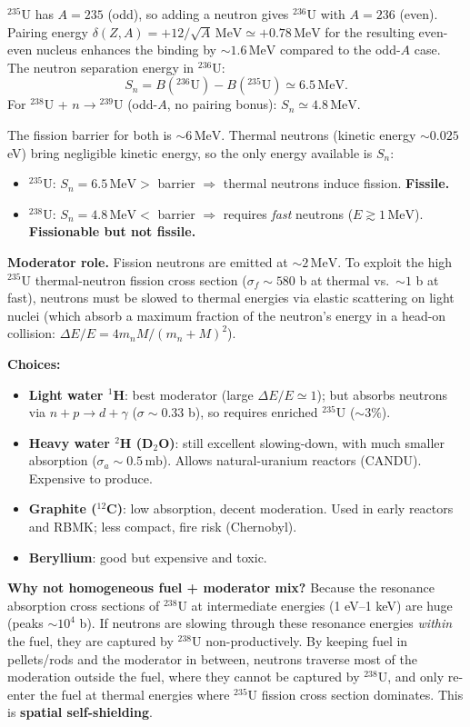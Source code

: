 \documentclass[11pt]{article}
\newcommand{\MeV}{\,\mathrm{MeV}}
\begin{document}
$^{235}$U has $A=235$ (odd), so adding a neutron gives $^{236}$U with $A=236$ (even). Pairing energy $\delta(Z,A)=+12/\sqrt{A}\MeV\simeq +0.78\MeV$ for the resulting even-even nucleus enhances the binding by $\sim 1.6\MeV$ compared to the odd-$A$ case. The neutron separation energy in $^{236}$U:
\[
S_n=B(^{236}\text{U})-B(^{235}\text{U})\simeq 6.5\MeV.
\]
For $^{238}$U + $n\to{}^{239}$U (odd-$A$, no pairing bonus): $S_n\simeq 4.8\MeV$.

The fission barrier for both is $\sim 6\MeV$. Thermal neutrons (kinetic energy $\sim 0.025$ eV) bring negligible kinetic energy, so the only energy available is $S_n$:
\begin{itemize}[itemsep=1pt]
\item $^{235}$U: $S_n=6.5\MeV>$ barrier $\Rightarrow$ thermal neutrons induce fission. \textbf{Fissile.}
\item $^{238}$U: $S_n=4.8\MeV<$ barrier $\Rightarrow$ requires \emph{fast} neutrons ($E\gtrsim 1\MeV$). \textbf{Fissionable but not fissile.}
\end{itemize}

\textbf{Moderator role.} Fission neutrons are emitted at $\sim 2\MeV$. To exploit the high $^{235}$U thermal-neutron fission cross section ($\sigma_f\sim 580$ b at thermal vs.\ $\sim 1$ b at fast), neutrons must be slowed to thermal energies via elastic scattering on light nuclei (which absorb a maximum fraction of the neutron's energy in a head-on collision: $\Delta E/E=4 m_n M/(m_n+M)^{2}$).

\textbf{Choices:}
\begin{itemize}[itemsep=1pt]
\item \textbf{Light water $^{1}$H}: best moderator (large $\Delta E/E\simeq 1$); but absorbs neutrons via $n+p\to d+\gamma$ ($\sigma\sim 0.33$ b), so requires enriched $^{235}$U ($\sim 3\%$).
\item \textbf{Heavy water $^{2}$H (D$_2$O)}: still excellent slowing-down, with much smaller absorption ($\sigma_a\sim 0.5\,\mathrm{mb}$). Allows natural-uranium reactors (CANDU). Expensive to produce.
\item \textbf{Graphite ($^{12}$C)}: low absorption, decent moderation. Used in early reactors and RBMK; less compact, fire risk (Chernobyl).
\item \textbf{Beryllium}: good but expensive and toxic.
\end{itemize}

\textbf{Why not homogeneous fuel + moderator mix?} Because the resonance absorption cross sections of $^{238}$U at intermediate energies (1 eV–1 keV) are huge (peaks $\sim 10^{4}$ b). If neutrons are slowing through these resonance energies \emph{within} the fuel, they are captured by $^{238}$U non-productively. By keeping fuel in pellets/rods and the moderator in between, neutrons traverse most of the moderation outside the fuel, where they cannot be captured by $^{238}$U, and only re-enter the fuel at thermal energies where $^{235}$U fission cross section dominates. This is \textbf{spatial self-shielding}.
\end{document}
